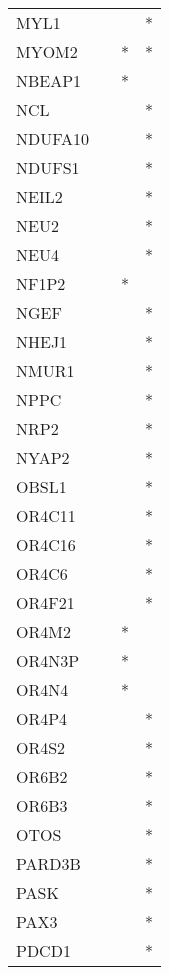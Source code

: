 \begin{longtable}{lccc}
MYL1           &       &    &       * \\
MYOM2          &       &  * &       * \\
NBEAP1         &       &  * &         \\
NCL            &       &    &       * \\
NDUFA10        &       &    &       * \\
NDUFS1         &       &    &       * \\
NEIL2          &       &    &       * \\
NEU2           &       &    &       * \\
NEU4           &       &    &       * \\
NF1P2          &       &  * &         \\
NGEF           &       &    &       * \\
NHEJ1          &       &    &       * \\
NMUR1          &       &    &       * \\
NPPC           &       &    &       * \\
NRP2           &       &    &       * \\
NYAP2          &       &    &       * \\
OBSL1          &       &    &       * \\
OR4C11         &       &    &       * \\
OR4C16         &       &    &       * \\
OR4C6          &       &    &       * \\
OR4F21         &       &    &       * \\
OR4M2          &       &  * &         \\
OR4N3P         &       &  * &         \\
OR4N4          &       &  * &         \\
OR4P4          &       &    &       * \\
OR4S2          &       &    &       * \\
OR6B2          &       &    &       * \\
OR6B3          &       &    &       * \\
OTOS           &       &    &       * \\
PARD3B         &       &    &       * \\
PASK           &       &    &       * \\
PAX3           &       &    &       * \\
PDCD1          &       &    &       * \\

\end{longtable}
